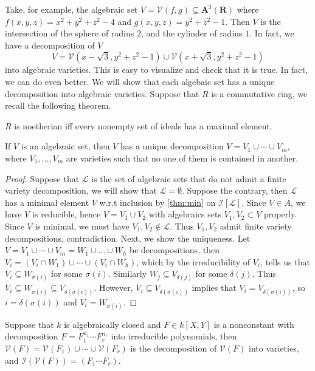 \documentclass[11pt]{book}
\begin{document}
Take, for example, the algebraic set $V=\mathcal{V}(f,g)\subseteq \mathbf A^3(\mathbf R)$ where $f(x,y,z)=x^2+y^2+z^2-4$ and $g(x,y,z)=y^2+z^2-1$. Then $V$ is the intersection of the sphere of radius $2$, and the cylinder of radius $1$. In fact, we have a decomposition of $V$
\[V=\mathcal{V}(x-\sqrt{3},y^2+z^2-1)\cup \mathcal{V}(x+\sqrt{3},y^2+z^2-1)\]
into algebraic varieties. This is easy to visualize and check that it is true. In fact, we can do even better. We will show that each algebaic set has a unique decomposition into algebraic varieties. Suppose that $R$ is a commutative ring, we recall the following theorem.
\begin{theorem}\label{thm:min}$R$ is noetherian iff every nonempty set of ideals has a maximal element.
\end{theorem}
\begin{theorem}If $V$ is an algebraic set, then $V$ has a unique decomposition $V=V_1\cup\cdots\cup V_m$, where $V_1,\dots,V_m$ are varieties such that no one of them is contained in another.
\begin{proof}
Suppose that $\mathcal{L}$ is the set of algebraic sets that do not admit a finite variety decomposition, we will show that $\mathcal{L}=\emptyset$. Suppose the contrary, then $\mathcal{L}$ has a minimal element $V$ w.r.t inclusion by \autoref{thm:min} on $\mathcal{I}[\mathcal{L}]$. Since $V\in A$, we have $V$ is reducible, hence $V=V_1\cup V_2$ with algebraics sets $V_1,V_2\subset V$ properly. Since $V$ is minimal, we must have $V_1,V_2\not\in \mathcal{L}$. Thus $V_1,V_2$ admit finite variety decompositions, contradiction. Next, we show the uniqueness. Let $V=V_1\cup\cdots\cup V_m=W_1\cup\dots\cup W_h$ be decompositions, then $V_i=(V_i\cap W_1)\cup\cdots\cup (V_i\cap W_h)$, which by the irreducibility of $V_i$, tells us that $V_i\subseteq W_{\sigma(i)}$ for some $\sigma(i)$. Similarly $W_j\subseteq V_{\delta(j)}$ for some $\delta(j)$. Thus $V_i\subseteq W_{\sigma(i)}\subseteq V_{\delta(\sigma(i))}$. However, $V_i\subseteq V_{\delta(\sigma(i))}$ implies that $V_i=V_{\delta(\sigma(i))}$, so $i=\delta(\sigma(i))$ and $V_i=W_{\sigma(i)}$. 
\end{proof}
\end{theorem}

\begin{proposition}Suppose that $k$ is algebraically closed and $F\in k[X,Y]$ is a nonconstant with decomposition $F=F_1^{n_1}\cdots F_r^{n_r}$ into irreducible polynomials, then $\mathcal{V}(F)=\mathcal{V}(F_1)\cup\cdots\cup \mathcal{V}(F_r)$ is the decomposition of $\mathcal{V}(F)$ into varieties, and $\mathcal{I}(\mathcal{V}(F))=(F_1\cdots F_r)$.
\end{proposition}
\end{document}
